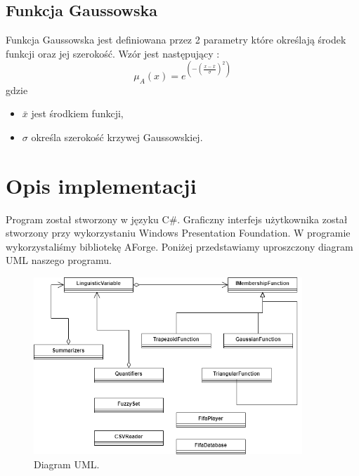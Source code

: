 \documentclass{classrep}
\begin{document}
	
	
	
	\subsection{Funkcja Gaussowska} 
	Funkcja Gaussowska jest definiowana przez 2 parametry które określają środek funkcji oraz jej szerokość. Wzór jest następujący \cite{kul}:
	\begin{equation}
		\mu_A(x) = e^{(-(\frac{x - \bar{x}}{\sigma})^2)}
	\end{equation}
	gdzie 
	\begin{itemize}
		\item $\bar{x}$ jest środkiem funkcji,
		\item $\sigma$ określa szerokość krzywej Gaussowskiej. 
	\end{itemize}

	\newpage
	\section{Opis implementacji} %
	Program został stworzony w języku C\#. Graficzny interfejs użytkownika został stworzony przy wykorzystaniu Windows Presentation Foundation. W programie wykorzystaliśmy bibliotekę AForge. Poniżej przedstawiamy uproszczony diagram UML naszego programu.
	
	\begin{figure}[h!]
		\centering
		\includegraphics[width=0.9\textwidth]{../uml/uml.png}
		\caption{Diagram UML.}
		\label{uml}
	\end{figure}
	
\end{document}
